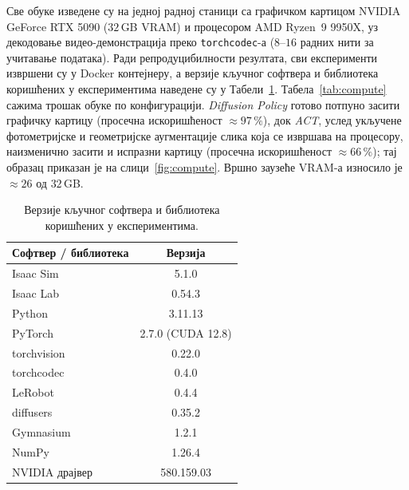 \documentclass[12pt, a4paper]{article}
\begin{document}
Све обуке изведене су на једној радној станици са графичком картицом NVIDIA GeForce RTX 5090 ($32$\,GB VRAM) и процесором AMD Ryzen~9 9950X, уз декодовање видео-демонстрација преко \texttt{torchcodec}-а ($8$–$16$ радних нити за учитавање података).
Ради репродуцибилности резултата, сви експерименти извршени су у Docker контејнеру, а верзије кључног софтвера и библиотека коришћених у експериментима наведене су у Табели~\ref{tab:sw_versions}.
Табела~\ref{tab:compute} сажима трошак обуке по конфигурацији.
\textit{Diffusion Policy} готово потпуно засити графичку картицу (просечна искоришћеност $\approx 97\,\%$), док \textit{ACT}, услед укључене фотометријске и геометријске аугментације слика која се извршава на процесору, наизменично засити и испразни картицу (просечна искоришћеност $\approx 66\,\%$); тај образац приказан је на слици~\ref{fig:compute}.
Вршно заузеће VRAM-а износило је $\approx 26$ од $32$\,GB.

\begin{table}[htbp]
    \caption{Верзије кључног софтвера и библиотека коришћених у експериментима.}
    \label{tab:sw_versions}
    \centering
    \begin{tabular}{l c}
        \toprule
        Софтвер / библиотека & Верзија \\
        \midrule
        Isaac Sim & 5.1.0 \\
        Isaac Lab & 0.54.3 \\
        Python & 3.11.13 \\
        PyTorch & 2.7.0 (CUDA 12.8) \\
        torchvision & 0.22.0 \\
        torchcodec & 0.4.0 \\
        LeRobot & 0.4.4 \\
        diffusers & 0.35.2 \\
        Gymnasium & 1.2.1 \\
        NumPy & 1.26.4 \\
        NVIDIA драјвер & 580.159.03 \\
        \bottomrule
    \end{tabular}
\end{table}
\end{document}
